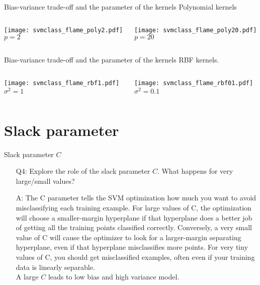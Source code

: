 \documentclass[unknownkeysallowed,10pt]{beamer}
\theoremstyle{definition} \newtheorem{rem}[thm]{Remark} \newtheorem*{rem*}{Remark}
\begin{document}
\begin{frame}{Bias-variance trade-off and the parameter of the kernels}
\vskip6pt
Polynomial kernels\\
\begin{columns}
\begin{column}{.5\textwidth}
\centering
\texttt{[image: svmclass\_flame\_poly2.pdf]}\\
$p = 2$ 
\end{column}
\begin{column}{.5\textwidth}
\centering
\texttt{[image: svmclass\_flame\_poly20.pdf]}\\
$p = 20$ 
\end{column}
\end{columns}
\end{frame}

\begin{frame}{Bias-variance trade-off and the parameter of the kernels}
\vskip6pt
RBF kernels.\\
\begin{columns}
\begin{column}{.5\textwidth}
\centering
\texttt{[image: svmclass\_flame\_rbf1.pdf]}\\
$\sigma^2 = 1$ 
\end{column}
\begin{column}{.5\textwidth}
\centering
\texttt{[image: svmclass\_flame\_rbf01.pdf]}\\
$\sigma^2 = 0.1$
\end{column}
\end{columns}
\end{frame}


\section{Slack parameter}

\begin{frame}{Slack parameter $C$}
\begin{itemize}
	\item[Q4:] Explore the role of the slack parameter $C$. What happens for very large/small values?
	\item[A:] The C parameter tells the SVM optimization how much you want to avoid misclassifying each training example. For large values of C, the optimization will choose a smaller-margin hyperplane if that hyperplane does a better job of getting all the training points classified correctly. Conversely, a very small value of C will cause the optimizer to look for a larger-margin separating hyperplane, even if that hyperplane misclassifies more points. For very tiny values of C, you should get misclassified examples, often even if your training data is linearly separable.\\
	A large $C$ leads to low bias and high variance model.
\end{itemize}
\end{frame}
\end{document}
